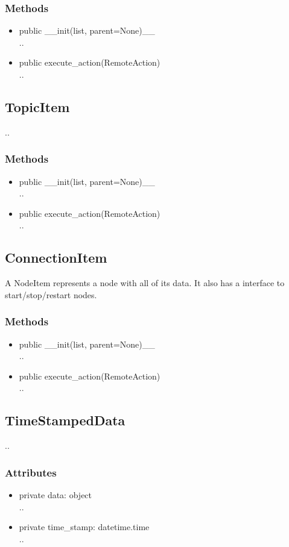 \subsubsection{Methods}
\begin{itemize}
  \item public \_\_init(list, parent=None)\_\_\\
  ..
  \item public execute\_action(RemoteAction)\\
  ..
\end{itemize}

\subsection{TopicItem}
..
\subsubsection{Methods}
\begin{itemize}
  \item public \_\_init(list, parent=None)\_\_\\
  ..
  \item public execute\_action(RemoteAction)\\
  ..
\end{itemize}

\subsection{ConnectionItem}
 A NodeItem represents a node with all of its data. It also has a interface to start/stop/restart nodes.
\subsubsection{Methods}
\begin{itemize}
  \item public \_\_init(list, parent=None)\_\_\\
  ..
  \item public execute\_action(RemoteAction)\\
  ..
\end{itemize}

\subsection{TimeStampedData}
..
\subsubsection{Attributes}
\begin{itemize}
  \item private data: object\\
  ..
  \item private time\_stamp: datetime.time\\
  ..
\end{itemize}

